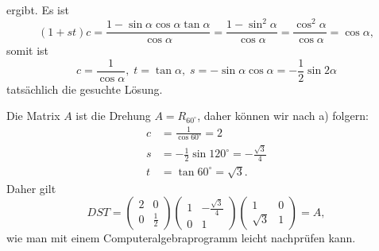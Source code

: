 \begin{loesung}
\begin{teilaufgaben}
ergibt.
Es ist
\[
(1+st)c
=
\frac{1-\sin\alpha\cos\alpha\tan\alpha}{\cos\alpha}
=
\frac{1-\sin^2\alpha}{\cos\alpha}
=
\frac{\cos^2\alpha}{\cos\alpha}=\cos\alpha,
\]
somit ist
\[
c=\frac{1}{\cos\alpha},\; t=\tan\alpha,\; s=-\sin\alpha\cos\alpha=-\frac12\sin2\alpha
\]
tatsächlich die gesuchte Lösung.
\item
Die Matrix $A$ ist die Drehung $A=R_{60^\circ}$, daher können wir nach
a) folgern:
\begin{align*}
c&=\frac{1}{\cos 60^\circ}= 2\\
s&=-\frac12\sin120^\circ =-\frac{\sqrt{3}}4\\
t&=\tan 60^\circ = \sqrt{3}.
\end{align*}
Daher gilt
\[
DST
=
\begin{pmatrix}2&0\\0&\frac12\end{pmatrix}
\begin{pmatrix}1&-\frac{\sqrt{3}}4\\0&1\end{pmatrix}
\begin{pmatrix}1&0\\ \sqrt{3}&1\end{pmatrix}
=
A,
\]
wie man mit einem Computeralgebraprogramm leicht nachprüfen kann.
\qedhere
\end{teilaufgaben}
\end{loesung}
